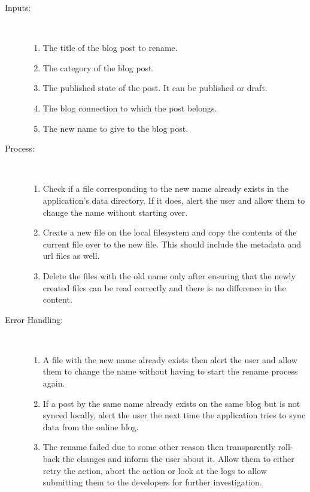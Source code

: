 \begin{description}
    \item [Inputs:] ~
    \begin{enumerate}[noitemsep]
        \item {The title of the blog post to rename.}
        \item {The category of the blog post.}
        \item {The published state of the post. It can be published or draft.}
        \item {The blog connection to which the post belongs.}
        \item {The new name to give to the blog post.}
    \end{enumerate}
    \item [Process:] ~
    \begin{enumerate}[noitemsep]
        \item {Check if a file corresponding to the new name already exists in the application's data directory. If it
               does, alert the user and allow them to change the name without starting over.}
        \item {Create a new file on the local filesystem and copy the contents of the current file over to the new
               file. This should include the metadata and url files as well.}
        \item {Delete the files with the old name only after ensuring that the newly created files can be read correctly
               and there is no difference in the content.}
    \end{enumerate}
    \item [Error Handling:] ~
    \begin{enumerate}[noitemsep]
        \item {A file with the new name already exists then alert the user and allow them to change the name without
               having to start the rename process again.}
        \item {If a post by the same name already exists on the same blog but is not synced locally, alert the user the
               next time the application tries to sync data from the online blog.}
        \item {The rename failed due to some other reason then transparently roll-back the changes and inform the user
               about it. Allow them to either retry the action, abort the action or look at the logs to allow submitting
               them to the developers for further investigation.}
    \end{enumerate}
\end{description}

